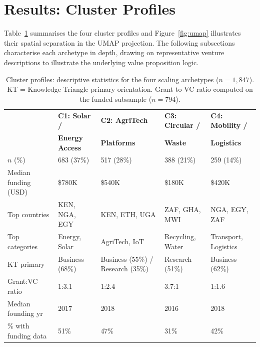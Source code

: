 \documentclass[review,12pt]{elsarticle}
\begin{document}
\section{Results: Cluster Profiles}
\label{sec:clusters}

Table~\ref{tab:cluster_profiles} summarises the four cluster
profiles and Figure~\ref{fig:umap} illustrates their spatial
separation in the UMAP projection. The following subsections
characterise each archetype in depth, drawing on representative
venture descriptions to illustrate the underlying value proposition
logic.

\begin{table}[htbp]
\centering
\caption{Cluster profiles: descriptive statistics for the four
scaling archetypes ($n = 1{,}847$). KT = Knowledge Triangle
primary orientation. Grant-to-VC ratio computed on the funded
subsample ($n = 794$).}
\label{tab:cluster_profiles}
\small
\begin{tabularx}{\linewidth}{@{}lXXXX@{}}
\toprule
 & \textbf{C1: Solar /} & \textbf{C2: AgriTech} &
   \textbf{C3: Circular /} & \textbf{C4: Mobility /} \\
 & \textbf{Energy Access} & \textbf{Platforms} &
   \textbf{Waste} & \textbf{Logistics} \\
\midrule
$n$ (\%) & 683 (37\%) & 517 (28\%) & 388 (21\%) & 259 (14\%) \\[3pt]
Median funding (USD) & \$780K & \$540K & \$180K & \$420K \\[3pt]
Top countries & KEN, NGA, EGY & KEN, ETH, UGA & ZAF, GHA, MWI &
               NGA, EGY, ZAF \\[3pt]
Top categories & Energy, Solar & AgriTech, IoT & Recycling, Water &
               Transport, Logistics \\[3pt]
KT primary & Business (68\%) & Business (55\%) /
             Research (35\%) & Research (51\%) & Business (62\%) \\[3pt]
Grant:VC ratio & 1:3.1 & 1:2.4 & 3.7:1 & 1:1.6 \\[3pt]
Median founding yr & 2017 & 2018 & 2016 & 2018 \\[3pt]
\% with funding data & 51\% & 47\% & 31\% & 42\% \\
\bottomrule
\end{tabularx}
\end{table}
\end{document}
